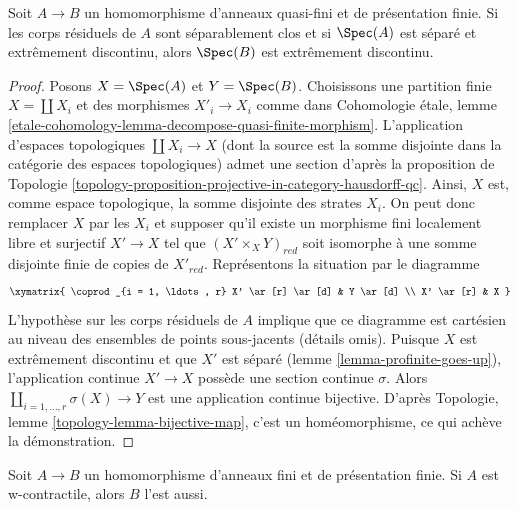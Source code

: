 \begin{lemma}
\label{lemma-finite-finitely-presented-over-extremally-disconnected}
Soit $A \to B$ un homomorphisme d'anneaux quasi-fini et de présentation finie.
Si les corps résiduels de $A$ sont séparablement clos
et si $\Spec(A)$ est séparé et extrêmement discontinu, alors $\Spec(B)$ est
extrêmement discontinu.
\end{lemma}

\begin{proof}
Posons $X = \Spec(A)$ et $Y = \Spec(B)$. Choisissons une partition finie
$X = \coprod X_i$ et des morphismes $X'_i \to X_i$ comme dans
Cohomologie \'etale, lemme
\ref{etale-cohomology-lemma-decompose-quasi-finite-morphism}.
L'application d'espaces topologiques $\coprod X_i \to X$ (dont la source
est la somme disjointe dans la catégorie des espaces topologiques)
admet une section d'après la proposition de Topologie
\ref{topology-proposition-projective-in-category-hausdorff-qc}.
Ainsi, $X$ est, comme espace topologique, la somme disjointe des
strates $X_i$. On peut donc remplacer $X$ par les $X_i$ et supposer qu'il
existe un morphisme fini localement libre et surjectif $X' \to X$ tel que
$(X' \times_X Y)_{red}$ soit isomorphe à une somme disjointe finie de
copies de $X'_{red}$. Représentons la situation par le diagramme
$$
\xymatrix{
\coprod_{i = 1, \ldots, r} X' \ar[r] \ar[d] & Y \ar[d] \\
X' \ar[r] & X
}
$$
L'hypothèse sur les corps résiduels de $A$ implique que
ce diagramme est cartésien au niveau des ensembles de points
sous-jacents (détails omis).
Puisque $X$ est extrêmement discontinu et que $X'$ est séparé
(lemme \ref{lemma-profinite-goes-up}), l'application continue
$X' \to X$ possède une section continue $\sigma$. Alors
$\coprod_{i = 1, \ldots, r} \sigma(X) \to Y$ est une application continue
bijective. D'après
Topologie, lemme \ref{topology-lemma-bijective-map},
c'est un homéomorphisme, ce qui achève la démonstration.
\end{proof}

\begin{lemma}
\label{lemma-finite-finitely-presented-over-w-contractible}
Soit $A \to B$ un homomorphisme d'anneaux fini et de présentation finie.
Si $A$ est w-contractile, alors $B$ l'est aussi.
\end{lemma}

